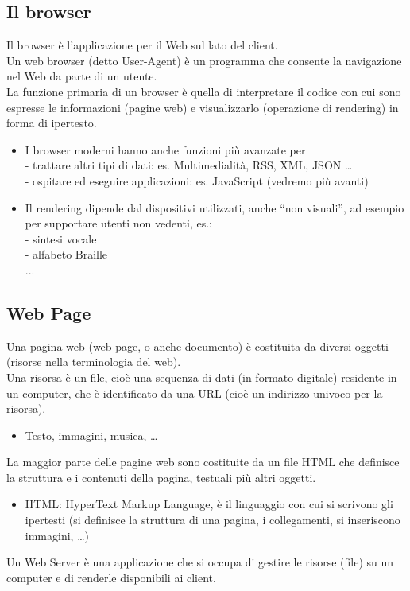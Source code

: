 \subsection{Il browser}
Il browser è l'applicazione per il Web sul lato del client.
\\Un web browser (detto User-Agent) è un programma che consente la navigazione nel Web da parte di un utente.
\\La funzione primaria di un browser è quella di interpretare il codice con cui sono espresse le informazioni (pagine web) e visualizzarlo (operazione di rendering) in forma di ipertesto.
\begin{itemize}
    \item I browser moderni hanno anche funzioni più avanzate per
    \\- trattare altri tipi di dati: es. Multimedialità, RSS, XML, JSON …
    \\- ospitare ed eseguire applicazioni: es. JavaScript (vedremo più avanti)
    \item Il rendering dipende dal dispositivi utilizzati, anche “non visuali”, ad esempio per supportare utenti non vedenti, es.:
    \\- sintesi vocale
    \\- alfabeto Braille
    \\...
\end{itemize}

\subsection{Web Page}
Una pagina web (web page, o anche documento) è costituita da diversi oggetti (risorse nella terminologia del web).
\\Una risorsa è un file, cioè una sequenza di dati (in formato digitale) residente in un computer, che è identificato da una URL (cioè un indirizzo univoco per la risorsa).
\begin{itemize}
    \item Testo, immagini, musica, …
\end{itemize}
La maggior parte delle pagine web sono costituite da un file HTML che definisce la struttura e i contenuti della pagina, testuali più altri oggetti.
\begin{itemize}
    \item HTML: HyperText Markup Language, è il linguaggio con cui si scrivono gli ipertesti (si definisce la struttura di una pagina, i collegamenti, si inseriscono immagini, …)
\end{itemize}
Un Web Server è una applicazione che si occupa di gestire le risorse (file) su un computer e di renderle disponibili ai client.


